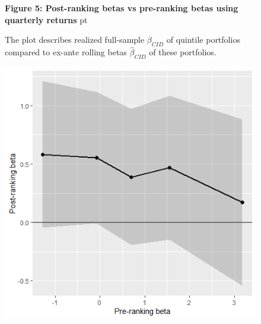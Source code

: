 \documentclass[12pt]{article}
\begin{document}
\begin{figure}
\textbf{Figure 5: Post-ranking betas vs pre-ranking betas using quarterly returns}
 pt
\begin{flushleft}
{The plot describes realized full-sample $\beta_{CID}$ of quintile portfolios compared to ex-ante rolling betas $\hat{\beta}_{CID}$ of these portfolios.}
\end{flushleft}
\centering
\includegraphics[width=1\textwidth]{betas_qtr.png}
\end{figure}
\end{document}
